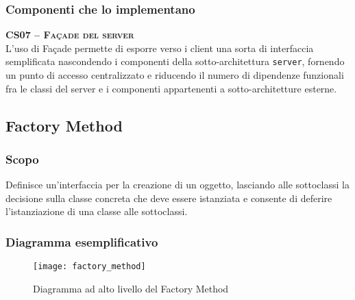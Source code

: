 \subsubsection{Componenti che lo implementano}
\begin{description}
  \item{\scshape\bfseries CS07 -- Façade del server}\\
L'uso di Façade permette di esporre verso i client una sorta di interfaccia semplificata nascondendo i componenti della sotto-architettura \texttt{server}, fornendo un punto di accesso centralizzato e riducendo il numero di dipendenze funzionali fra le classi del server e i componenti appartenenti a sotto-architetture esterne.

\end{description}

\subsection{Factory Method}

\subsubsection{Scopo}
Definisce un'interfaccia per la creazione di un oggetto, lasciando alle sottoclassi la decisione sulla classe concreta che deve essere istanziata e consente di deferire l'istanziazione di una classe alle sottoclassi.

\subsubsection{Diagramma esemplificativo}
\begin{figure}[H]
  \centering
  \texttt{[image: factory\_method]}
  \caption{Diagramma ad alto livello del  Factory Method}\label{fig:factory_method}
\end{figure}

